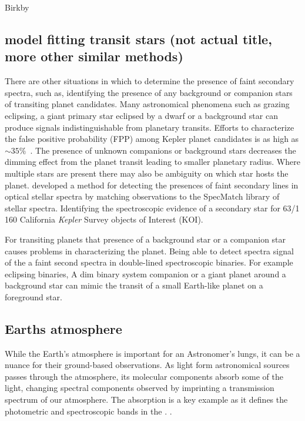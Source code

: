 Birkby


\subsection{model fitting transit stars (not actual title, more other similar methods)}
There are other situations in which to determine the presence of faint secondary spectra, such as, identifying the presence of any background or companion stars of transiting planet candidates.
Many astronomical phenomena such as grazing eclipsing, a giant primary star eclipsed by a dwarf or a background star can produce signals indistinguishable from planetary transits.
Efforts to characterize the false positive probability (FPP) among Kepler planet candidates is as high as $\sim35\%$~\citep{santerne_sophie_2012}.
The presence of unknown companions or background stars decreases the dimming effect from the planet transit leading to smaller planetary radius.
Where multiple stars are present there may also be ambiguity on which star hosts the planet.
\citet{kolbl_detection_2015} developed a method for detecting the presences of faint secondary lines in optical stellar spectra by matching observations to the SpecMatch library of stellar spectra.
Identifying the spectroscopic evidence of a secondary star for 63/1\,160 California \emph{Kepler} Survey objects of Interest (KOI).


For transiting planets that presence of a background star or a companion star causes problems in characterizing the planet.
Being able to detect spectra signal of the a faint second spectra in double-lined spectroscopic binaries.
For example eclipsing binaries,
A dim binary system companion or a giant planet around a background star can mimic the transit of a small Earth-like planet on a foreground star.






\subsection{Earths atmosphere}
While the Earth's atmosphere is important for an Astronomer's lungs, it can be a nuance for their ground-based observations.
As light form astronomical sources passes through the atmosphere, its molecular components absorb some of the light, changing spectral components observed by imprinting a transmission spectrum of our atmosphere.
The  absorption is a key example as it defines the photometric and spectroscopic bands in the \nir{}. .

